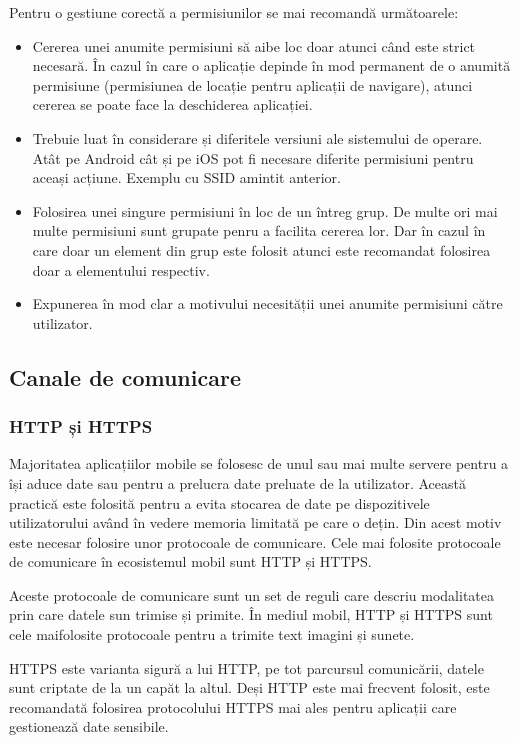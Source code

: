 \documentclass[12pt]{article}
\begin{document}
Pentru o gestiune corectă a permisiunilor se mai recomandă următoarele:

\begin{itemize}
    \item Cererea unei anumite permisiuni să aibe loc doar atunci când este strict necesară.
    În cazul în care o aplicație depinde în mod permanent de o anumită permisiune (permisiunea de locație pentru aplicații de navigare),
    atunci cererea se poate face la deschiderea aplicației.
    \item Trebuie luat în considerare și diferitele versiuni ale sistemului de operare. Atât pe Android cât și pe iOS
    pot fi necesare diferite permisiuni pentru aceași acțiune. Exemplu cu SSID amintit anterior.
    \item Folosirea unei singure permisiuni în loc de un întreg grup. De multe ori mai multe permisiuni sunt
    grupate penru a facilita cererea lor. Dar în cazul în care doar un element din grup este folosit atunci este 
    recomandat folosirea doar a elementului respectiv.
    \item Expunerea în mod clar a motivului necesității unei anumite permisiuni către utilizator.
\end{itemize}



\subsection{Canale de comunicare}
\subsubsection{HTTP și HTTPS}

Majoritatea aplicațiilor mobile se folosesc de unul sau mai multe servere pentru a își aduce date
sau pentru a prelucra date preluate de la utilizator. Această practică este folosită pentru a evita  stocarea de
date pe dispozitivele utilizatorului având în vedere memoria limitată pe care o dețin. Din acest motiv 
este necesar folosire unor protocoale de comunicare. Cele mai folosite protocoale de comunicare în ecosistemul
mobil sunt HTTP și HTTPS.

Aceste protocoale de comunicare sunt un set de reguli care descriu modalitatea prin care datele sun trimise și 
primite. În mediul mobil, HTTP și HTTPS sunt cele maifolosite protocoale pentru a trimite text imagini și sunete.

HTTPS este varianta sigură a lui HTTP, pe tot parcursul comunicării, datele sunt criptate de la un capăt la altul.
Deși HTTP este mai frecvent folosit, este recomandată folosirea protocolului HTTPS mai ales pentru aplicații 
care gestionează date sensibile.
\end{document}
